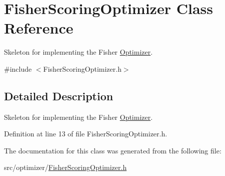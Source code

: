 \hypertarget{classFisherScoringOptimizer}{}\section{Fisher\+Scoring\+Optimizer Class Reference}
\label{classFisherScoringOptimizer}


Skeleton for implementing the Fisher \hyperlink{classOptimizer}{Optimizer}.  




{\ttfamily \#include $<$Fisher\+Scoring\+Optimizer.\+h$>$}



\subsection{Detailed Description}
Skeleton for implementing the Fisher \hyperlink{classOptimizer}{Optimizer}. 

Definition at line 13 of file Fisher\+Scoring\+Optimizer.\+h.



The documentation for this class was generated from the following file\+:\begin{DoxyCompactItemize}
\item 
src/optimizer/\hyperlink{FisherScoringOptimizer_8h}{Fisher\+Scoring\+Optimizer.\+h}\end{DoxyCompactItemize}
